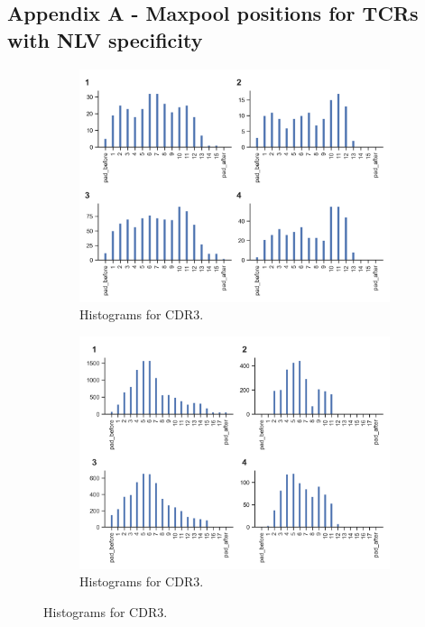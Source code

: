 \subsection*{Appendix A - Maxpool positions for TCRs with NLV specificity}

\begin{figure}[H]
\centering
\begin{subfigure}[b]{0.65\textwidth}
   \includegraphics[width=0.95\linewidth]{figures/attention_results/maxpool_cdr3a_nlv12.png}
   \caption{Histograms for CDR3{\textalpha}.}
   \label{fig:pool_nlv12a} 
\end{subfigure}

\begin{subfigure}[b]{0.65\textwidth}
   \includegraphics[width=0.95\linewidth]{figures/attention_results/maxpool_cdr3b_gil12.png}
   \caption{Histograms for CDR3{\textbeta}.}
   \label{fig:pool_nlv12b}
\end{subfigure}


\end{figure}
